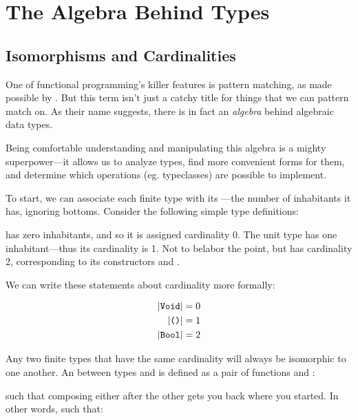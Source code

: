 \documentclass[book.tex]{subfiles}
\begin{document}
\chapter{The Algebra Behind Types}

\section{Isomorphisms and Cardinalities}

One of functional programming's killer features is pattern matching, as made
possible by . But this term
isn't just a catchy title for things that we can pattern match on. As their name
suggests, there is in fact an \emph{algebra} behind algebraic data types.

Being comfortable understanding and manipulating this algebra is a mighty
superpower---it allows us to analyze types, find more convenient forms for them,
and determine which operations (eg. typeclasses) are possible to implement.

To start, we can associate each finite type with its ---the
number of inhabitants it has, ignoring bottoms. Consider the following simple
type definitions:


 has zero inhabitants, and so it is assigned cardinality 0. The unit
type \ty{()} has one inhabitant---thus its cardinality is 1. Not to belabor
the point, but  has cardinality 2, corresponding to its constructors
 and .

We can write these statements about cardinality more formally:

\begin{align*}
  \lvert\texttt{Void}\rvert &= 0 \\
  \lvert\texttt{()}\rvert &= 1 \\
  \lvert\texttt{Bool}\rvert &= 2 \\
\end{align*}

Any two finite types that have the same cardinality will always be isomorphic to
one another. An  between types  and  is defined as
a pair of functions  and :


such that composing either after the other gets you back where you started. In
other words, such that:
\end{document}
